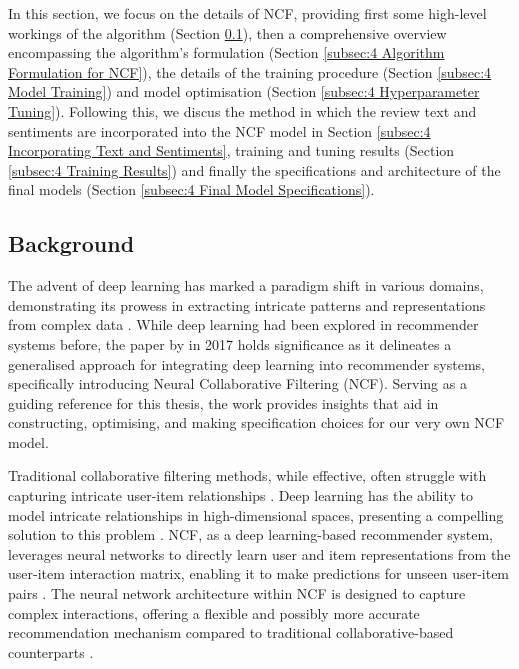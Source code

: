 In this section, we focus on the details of NCF, providing first some high-level workings of the algorithm (Section \ref{subsec:4 Background}), then a comprehensive overview encompassing the algorithm's formulation (Section \ref{subsec:4 Algorithm Formulation for NCF}), the details of the training procedure (Section \ref{subsec:4 Model Training}) and model optimisation (Section \ref{subsec:4 Hyperparameter Tuning}). Following this, we discus the method in which the review text and sentiments are incorporated into the NCF model in Section \ref{subsec:4 Incorporating Text and Sentiments}, training and tuning results (Section \ref{subsec:4 Training Results}) and finally the specifications and architecture of the final models (Section \ref{subsec:4 Final Model Specifications}).

\subsection{Background}
\label{subsec:4 Background}

The advent of deep learning has marked a paradigm shift in various domains, demonstrating its prowess in extracting intricate patterns and representations from complex data \cite{steck2021deep}. While deep learning had been explored in recommender systems before, the paper by \cite{he2017neural} in 2017 holds significance as it delineates a generalised approach for integrating deep learning into recommender systems, specifically introducing Neural Collaborative Filtering (NCF). Serving as a guiding reference for this thesis, the work provides insights that aid in constructing, optimising, and making specification choices for our very own NCF model.

Traditional collaborative filtering methods, while effective, often struggle with capturing intricate user-item relationships \cite{steck2021deep}. Deep learning has the ability to model intricate relationships in high-dimensional spaces, presenting a compelling solution to this problem \cite{he2017neural}. NCF, as a deep learning-based recommender system, leverages neural networks to directly learn user and item representations from the user-item interaction matrix, enabling it to make predictions for unseen user-item pairs \cite{he2017neural}. The neural network architecture within NCF is designed to capture complex interactions, offering a flexible and possibly more accurate recommendation mechanism compared to traditional collaborative-based counterparts \cite{he2017neural}.

